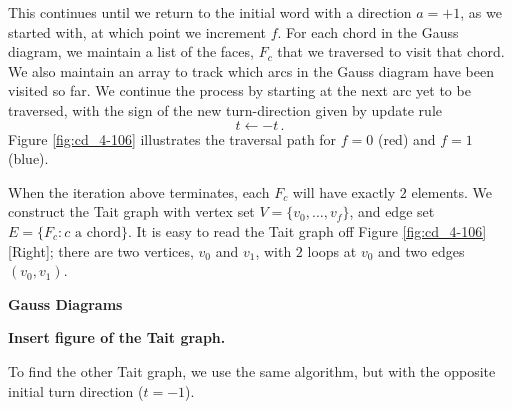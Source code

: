\documentclass[12pt]{report}
\newcommand{\notered}[1]{{\color{Red} \textbf{#1}}}
\newcommand{\notegreen}[1]{{\color{Green} \textbf{#1}}}
\begin{document}
	This continues until we return to the initial word with a direction $a = +1$, as we started with, at which point we increment $f$. For each chord in the Gauss diagram, we maintain a list of the faces, $F_{c}$ that we traversed to visit that chord. We also maintain an array to track which arcs in the Gauss diagram have been visited so far. We continue the process by starting at the next arc yet to be traversed, with the sign of the new turn-direction given by update rule
	\[t \leftarrow -t\,.\]
	Figure \ref{fig:cd_4-106} illustrates the traversal path for $f = 0$ (red) and $f = 1$ (blue).
	
	When the iteration above terminates, each $F_{c}$ will have exactly $2$ elements. We construct the Tait graph with vertex set $V = \{v_{0}, \dots, v_{f}\}$, and edge set $E = \{F_{c} : \text{$c$ a chord}\}$. It is easy to read the Tait graph off Figure \ref{fig:cd_4-106} [Right]; there are two vertices, $v_{0}$ and $v_{1}$, with $2$ loops at $v_{0}$ and two edges $(v_{0}, v_{1})$. 
	
	\notered{Gauss Diagrams}
	
	\notegreen{Insert figure of the Tait graph.}
	
	To find the other Tait graph, we use the same algorithm, but with the opposite initial turn direction ($t = -1$).
	
\end{document}
